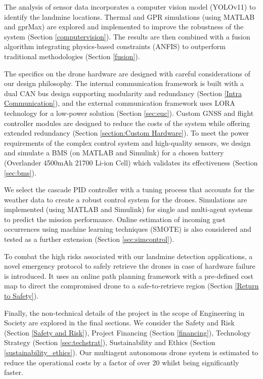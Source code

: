 The analysis of sensor data incorporates a computer vision model (YOLOv11) to identify the landmine locations. Thermal and \gls{GPR} simulations (using MATLAB and gprMax) are explored and implemented to improve the robustness of the system (Section \ref{computervision}). The results are then combined with a fusion algorithm integrating physics-based constraints (ANFIS) to outperform traditional methodologies (Section \ref{fusion}). 

The specifics on the drone hardware are designed with careful considerations of our design philosophy. The internal communication framework is built with a dual \gls{CAN} bus design supporting modularity and redundancy (Section \ref{Intra Communication}), and the external communication framework uses \gls{LORA} technology for a low-power solution (Section \ref{sec:euc}). Custom \gls{GNSS} and flight controller modules are designed to reduce the costs of the system while offering extended redundancy (Section \ref{section:Custom Hardware}). To meet the power requirements of the complex control system and high-quality sensors, we design and simulate a \gls{BMS} (on MATLAB and Simulink) for a chosen battery (Overlander 4500mAh 21700 Li-ion Cell) which validates its effectiveness (Section \ref{sec:bms}).

We select the cascade PID controller with a tuning process that accounts for the weather data to create a robust control system for the drones. Simulations are implemented (using MATLAB and Simulink) for single and multi-agent systems to predict the mission performance. Online estimation of incoming gust occurrences using machine learning techniques (SMOTE) is also considered and tested as a further extension (Section \ref{sec:simcontrol}). 

To combat the high risks associated with our landmine detection applications, a novel emergency protocol to safely retrieve the drones in case of hardware failure is introduced. It uses an online path planning framework with a pre-defined cost map to direct the compromised drone to a safe-to-retrieve region (Section \ref{Return to Safety}).

Finally, the non-technical details of the project in the scope of Engineering in Society are explored in the final sections. We consider the Safety and Risk (Section \ref{Safety and Risk}), Project Financing (Section \ref{financing}), Technology Strategy (Section \ref{sec:techstrat}), Sustainability and Ethics (Section \ref{sustainability_ethics}). Our multiagent autonomous drone system is estimated to reduce the operational costs by a factor of over 20 whilst being significantly faster. 

